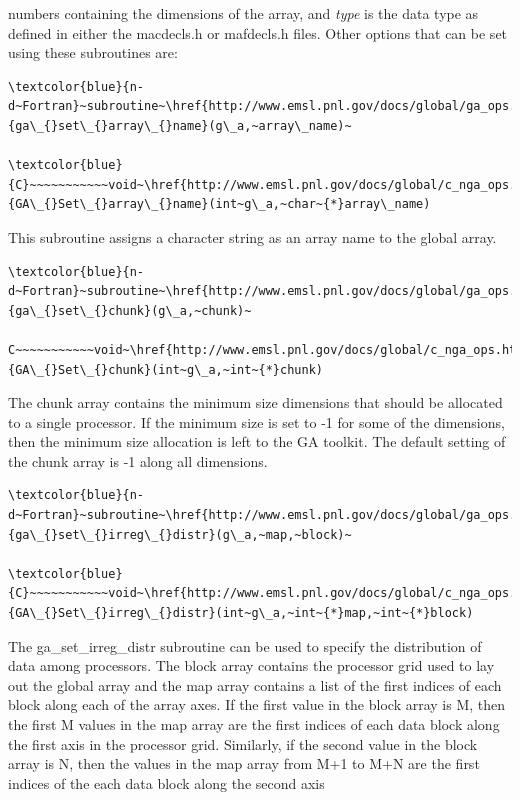 numbers containing the dimensions of the array, and \emph{type} is
the data type as defined in either the macdecls.h or mafdecls.h files.
Other options that can be set using these subroutines are:
\begin{verbatim}
\textcolor{blue}{n-d~Fortran}~subroutine~\href{http://www.emsl.pnl.gov/docs/global/ga_ops.html\#NGA_SET_ARRAY_NAME}{ga\_{}set\_{}array\_{}name}(g\_a,~array\_name)~

\textcolor{blue}{C}~~~~~~~~~~~void~\href{http://www.emsl.pnl.gov/docs/global/c_nga_ops.html\#GA_SET_ARRAY_NAME}{GA\_{}Set\_{}array\_{}name}(int~g\_a,~char~{*}array\_name)
\end{verbatim}
This subroutine assigns a character string as an array name to the
global array.
\begin{verbatim}
\textcolor{blue}{n-d~Fortran}~subroutine~\href{http://www.emsl.pnl.gov/docs/global/ga_ops.html\#NGA_SET_CHUNK}{ga\_{}set\_{}chunk}(g\_a,~chunk)~

C~~~~~~~~~~~void~\href{http://www.emsl.pnl.gov/docs/global/c_nga_ops.html\#GA_SET_CHUNK}{GA\_{}Set\_{}chunk}(int~g\_a,~int~{*}chunk)
\end{verbatim}
The chunk array contains the minimum size dimensions that should be
allocated to a single processor. If the minimum size is set to -1
for some of the dimensions, then the minimum size allocation is left
to the GA toolkit. The default setting of the chunk array is -1 along
all dimensions.
\begin{verbatim}
\textcolor{blue}{n-d~Fortran}~subroutine~\href{http://www.emsl.pnl.gov/docs/global/ga_ops.html\#NGA_SET_IRREG_DISTR}{ga\_{}set\_{}irreg\_{}distr}(g\_a,~map,~block)~

\textcolor{blue}{C}~~~~~~~~~~~void~\href{http://www.emsl.pnl.gov/docs/global/c_nga_ops.html\#GA_SET_IRREG_DISTR}{GA\_{}Set\_{}irreg\_{}distr}(int~g\_a,~int~{*}map,~int~{*}block)
\end{verbatim}
The ga\_set\_irreg\_distr subroutine can be used to specify the distribution
of data among processors. The block array contains the processor grid
used to lay out the global array and the map array contains a list
of the first indices of each block along each of the array axes. If
the first value in the block array is M, then the first M values in
the map array are the first indices of each data block along the first
axis in the processor grid. Similarly, if the second value in the
block array is N, then the values in the map array from M+1 to M+N
are the first indices of the each data block along the second axis
